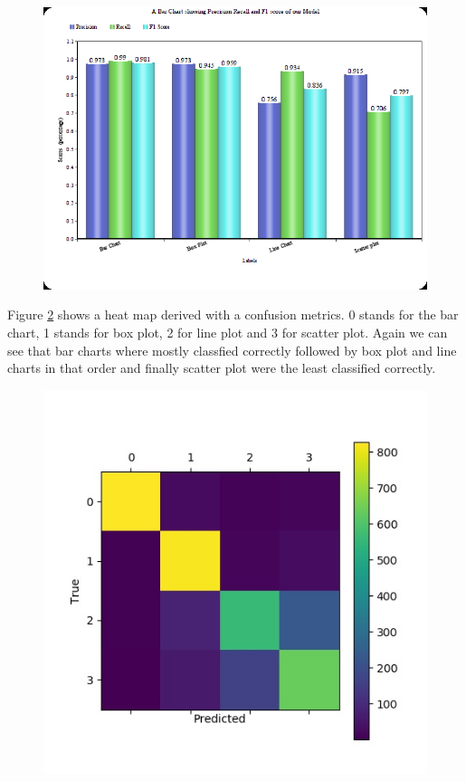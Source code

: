 \documentclass[12pt, a4paper,oneside]{report}
\begin{document}
\begin{figure}[!htbp]
	\includegraphics [scale=0.78] {scores.png}
	\label{fig:matrics}
\end{figure}


Figure \ref{fig:confusion} shows a heat map derived with a confusion metrics. 0 stands for the bar chart, 1 stands for box plot, 2 for line plot and 3 for scatter plot. Again we can see that bar charts where mostly classfied correctly followed by box plot and line charts in that order and finally scatter plot were the least classified correctly.



\begin{figure}[!htbp]
	\includegraphics [scale=1.2] {confusion.jpg}
	\label{fig:confusion}
\end{figure}
\end{document}
